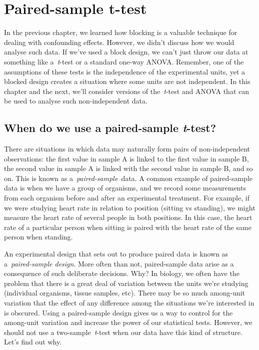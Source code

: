 \documentclass[
]{book}
\begin{document}
\hypertarget{paired-sample-t-test}{%
\chapter{Paired-sample t-test}\label{paired-sample-t-test}}

In the previous chapter, we learned how blocking is a valuable technique for dealing with confounding effects. However, we didn't discuss how we would analyse such data. If we've used a block design, we can't just throw our data at something like a~\emph{t}-test or a standard one-way ANOVA. Remember, one of the assumptions of these tests is the independence of the experimental units, yet a blocked design creates a situation where some units are not independent. In this chapter and the next, we'll consider versions of the~\emph{t}-test and ANOVA that can be used to analyse such non-independent data.

\hypertarget{when-do-we-use-a-paired-sample-t-test}{%
\section{\texorpdfstring{When do we use a paired-sample \emph{t}-test?}{When do we use a paired-sample t-test?}}\label{when-do-we-use-a-paired-sample-t-test}}

There are situations in which data may naturally form pairs of non-independent observations: the first value in sample A is linked to the first value in sample B, the second value in sample A is linked with the second value in sample B, and so on. This is known as a~\emph{paired-sample}~data. A common example of paired-sample data is when we have a group of organisms, and we record some measurements from each organism before and after an experimental treatment. For example, if we were studying heart rate in relation to position (sitting vs standing), we might measure the heart rate of several people in both positions. In this case, the heart rate of a particular person when sitting is paired with the heart rate of the same person when standing.

An experimental design that sets out to produce paired data is known as a~\emph{paired-sample design}. More often than not, paired-sample data arise as a consequence of such deliberate decisions. Why? In biology, we often have the problem that there is a great deal of variation between the units we're studying (individual organisms, tissue samples, etc). There may be so much among-unit variation that the effect of any difference among the situations we're interested in is obscured. Using a paired-sample design gives us a way to control for the among-unit variation and increase the power of our statistical tests. However, we should not use a two-sample~\emph{t}-test when our data have this kind of structure. Let's find out why.
\end{document}
